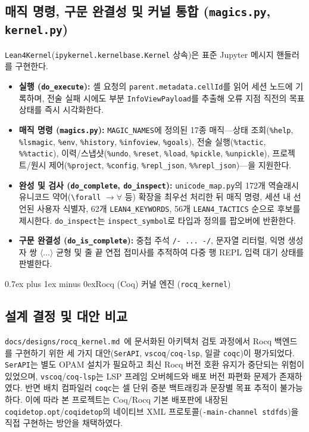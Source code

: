 \documentclass[journal]{IEEEtran}
\makeatletter
\def\section{\@startsection{section}{1}{\z@}{1.5ex plus 1.5ex minus 0.5ex}%
  {0.7ex plus 1ex minus 0ex}{\normalfont\normalsize\centering\bfseries}}%
\newcommand{\code}[1]{\texttt{#1}}
\makeatother
\begin{document}
\subsection{매직 명령, 구문 완결성 및 커널 통합 (\code{magics.py}, \code{kernel.py})}
\code{Lean4Kernel}(\code{ipykernel.kernelbase.Kernel} 상속)은 표준 Jupyter 메시지 핸들러를 구현한다.
\begin{itemize}
  \item \textbf{실행 (\code{do\_execute}):} 셸 요청의 \code{parent.metadata.cellId}를 읽어 세션 노드에 기록하며, 전술 실패 시에도 부분 \code{InfoViewPayload}를 추출해 오류 지점 직전의 목표 상태를 즉시 시각화한다.
  \item \textbf{매직 명령 (\code{magics.py}):} \code{MAGIC\_NAMES}에 정의된 17종 매직—상태 조회(\code{\%help}, \code{\%lsmagic}, \code{\%env}, \code{\%history}, \code{\%infoview}, \code{\%goals}), 전술 실행(\code{\%tactic}, \code{\%\%tactic}), 이력/스냅샷(\code{\%undo}, \code{\%reset}, \code{\%load}, \code{\%pickle}, \code{\%unpickle}), 프로젝트/원시 제어(\code{\%project}, \code{\%config}, \code{\%repl\_json}, \code{\%\%repl\_json})—을 지원한다.
  \item \textbf{완성 및 검사 (\code{do\_complete}, \code{do\_inspect}):} \code{unicode\_map.py}의 172개 역슬래시 유니코드 약어(\code{\textbackslash forall} $\rightarrow \forall$ 등) 확장을 최우선 처리한 뒤 매직 명령, 세션 내 선언된 사용자 식별자, 62개 \code{LEAN4\_KEYWORDS}, 56개 \code{LEAN4\_TACTICS} 순으로 후보를 제시한다. \code{do\_inspect}는 \code{inspect\_symbol}로 타입과 정의를 팝오버에 반환한다.
  \item \textbf{구문 완결성 (\code{do\_is\_complete}):} 중첩 주석 \code{/- ... -/}, 문자열 리터럴, 익명 생성자 쌍 $\langle\dots\rangle$ 균형 및 줄 끝 연접 접미사를 추적하여 다중 행 REPL 입력 대기 상태를 판별한다.
\end{itemize}

\section{Rocq (Coq) 커널 엔진 (\code{rocq\_kernel})}

\subsection{설계 결정 및 대안 비교}
\code{docs/designs/rocq\_kernel.md}~\cite{rocq_design_2026}에 문서화된 아키텍처 검토 과정에서 Rocq 백엔드를 구현하기 위한 세 가지 대안(\code{SerAPI}, \code{vscoq}/\code{coq-lsp}, 일괄 \code{coqc})이 평가되었다. \code{SerAPI}는 별도 OPAM 설치가 필요하고 최신 Rocq 버전 호환 유지가 중단되는 위험이 있었으며, \code{vscoq}/\code{coq-lsp}는 LSP 프레임 오버헤드와 배포 버전 파편화 문제가 존재하였다. 반면 배치 컴파일러 \code{coqc}는 셀 단위 증분 백트래킹과 문장별 목표 추적이 불가능하다. 이에 따라 본 프로젝트는 Coq/Rocq 기본 배포판에 내장된 \code{coqidetop.opt}/\code{coqidetop}의 네이티브 XML 프로토콜(\code{-main-channel stdfds})을 직접 구현하는 방안을 채택하였다.
\end{document}
